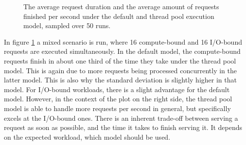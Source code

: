 \begin{figure}
    \begin{center}
        
    \end{center}
    \caption{The average request duration and the average amount of requests finished per second under the default and thread pool execution model, sampled over 50 runs.}
    \label{fig:default_vs_thread_pool_mixed}
\end{figure}

In figure \ref{fig:default_vs_thread_pool_mixed} a mixed scenario is run, where 16 compute-bound and 16 I/O-bound requests are executed simultaneously. In the default model, the compute-bound requests finish in about one third of the time they take under the thread pool model. This is again due to more requests being processed concurrently in the latter model. This is also why the standard deviation is slightly higher in that model. For I/O-bound workloads, there is a slight advantage for the default model. However, in the context of the plot on the right side, the thread pool model is able to handle more requests per second in general, but specifically excels at the I/O-bound ones. There is an inherent trade-off between serving a request as soon as possible, and the time it takes to finish serving it. It depends on the expected workload, which model should be used.
